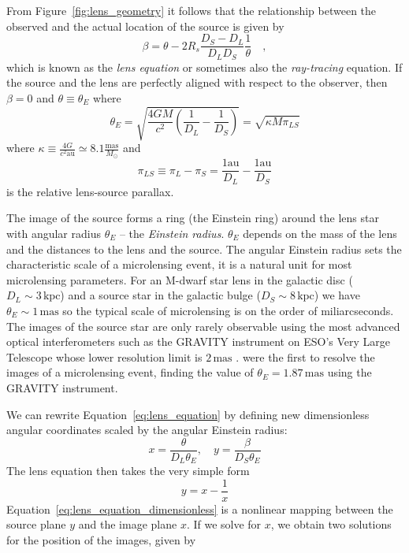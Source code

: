 \documentclass[12pt]{report}
\begin{document}
From Figure~\ref{fig:lens_geometry} it follows that the relationship between
the observed and the actual location of the source is given by
\begin{equation}
    \beta=\theta-2 R_s \frac{D_S-D_L}{D_LD_S}
    \frac{1}{\theta}\quad,
    \label{eq:lens_equation}
\end{equation}
which is known as the \emph{lens equation} or sometimes also the \emph{ray-tracing}
equation. If the source and the lens are perfectly aligned with respect to the observer,
then $\beta=0$ and $\theta\equiv\theta_E$ where
\begin{equation}
    \theta_E= \sqrt{ \frac{4GM}{c^2} \left( \frac{1}{D_L} - \frac{1}{D_S} \right)}=
    \sqrt{\kappa M\pi_{LS}}
    \label{eq:angular_einstein_radius}
\end{equation}
where $\kappa \equiv \frac{4 G}{c^{2} \mathrm{au}} \simeq 8.1 \frac{\mathrm{mas}}{M_{\odot}}$
and
\begin{equation}
    \pi_{LS}\equiv\pi_L - \pi_S=\frac{1\mathrm{au}}{D_L}-\frac{1\mathrm{au}}{D_S}
\end{equation}
is the relative lens-source parallax.

The image of the source forms a ring (the Einstein ring) around the lens star
with angular radius $\theta_E$ -- the \emph{Einstein radius}. $\theta_E$
depends on the mass of the lens and the distances to the lens and the source.
The angular Einstein radius sets the characteristic scale of a microlensing
event, it is a natural unit for most microlensing parameters. For an M-dwarf
star lens in the galactic disc ($D_L\sim 3\,\textrm{kpc}$) and a source star in
the galactic bulge ($D_S\sim 8\,\textrm{kpc}$) we have $\theta_E\sim
    1\,\textrm{mas}$ so the typical scale of microlensing is on the order of
miliarcseconds. The images of the source star are only rarely observable using
the most advanced optical interferometers such as the GRAVITY instrument on
ESO's Very Large Telescope whose lower resolution limit is $2\,\textrm{mas}$
\citep{arXiv:1705.02345}. \cite{2019ApJ...871...70D} were the first to resolve
the images of a microlensing event, finding the value of
$\theta_E=1.87\,\textrm{mas}$ using the GRAVITY instrument.

We can rewrite Equation~\ref{eq:lens_equation} by defining new dimensionless
angular coordinates scaled by the angular Einstein radius:
\begin{equation}
    x= \frac{\theta}{D_L\theta_E}, \quad y=\frac{\beta}{D_S\theta_E}
\end{equation}
The lens equation then takes the very simple form
\begin{equation}
    y= x- \frac{ 1}{x}
    \label{eq:lens_equation_dimensionless}
\end{equation}
Equation~\ref{eq:lens_equation_dimensionless} is a nonlinear mapping between the
source plane $y$ and the image plane $x$.
If we solve for $x$, we obtain two solutions for the position of the images, given by
\end{document}
